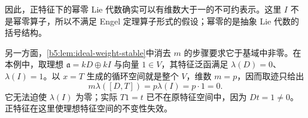 因此，正特征下的幂零 Lie 代数确实可以有维数大于一的不可约表示。这里 \(I\) 不是幂零算子，所以不满足 Engel 定理算子形式的假设；幂零的是抽象 Lie 代数的括号结构。

\ProseParagraphBreak

另一方面，\cref{b5:lem:ideal-weight-stable}中消去 \(m\) 的步骤要求它于基域中非零。在本例中，取理想 \(\mathfrak a=kD\oplus kI\) 与向量 \(1\in V\)，其特征泛函满足 \(\lambda(D)=0\)、\(\lambda(I)=1\)。以 \(x=T\) 生成的循环空间就是整个 \(V\)，维数 \(m=p\)，因而取迹只给出
\[
	m\lambda([D,T])=p\lambda(I)=p\cdot1=0.
\]
它无法迫使 \(\lambda(I)\) 为零；实际 \(T1=t\) 已不在原特征空间中，因为 \(Dt=1\ne0\)。正特征在这里使理想特征空间的不变性失效。
